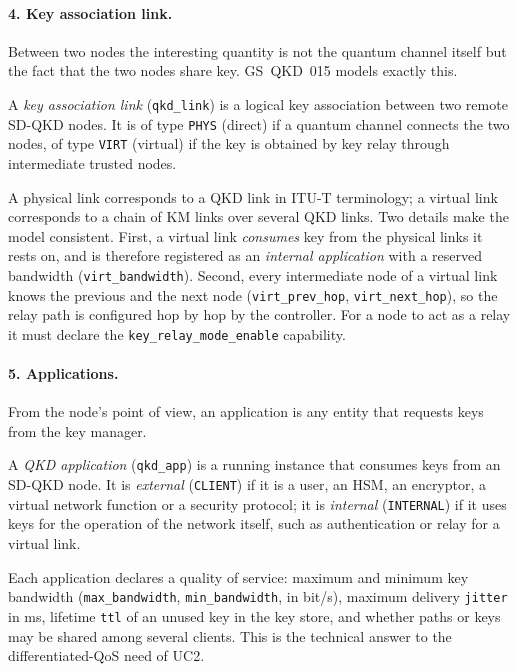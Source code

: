 

\paragraph{4. Key association link.}
Between two nodes the interesting quantity is not the quantum channel
itself but the fact that the two nodes share key. GS~QKD~015 models exactly
this.

\begin{definition}
A \emph{key association link} (\texttt{qkd\_link}) is a logical key
association between two remote SD-QKD nodes. It is of type \texttt{PHYS}
(direct) if a quantum channel connects the two nodes, of type \texttt{VIRT}
(virtual) if the key is obtained by key relay through intermediate trusted
nodes.
\end{definition}

A physical link corresponds to a QKD link in ITU-T terminology; a virtual
link corresponds to a chain of KM links over several QKD links. Two details
make the model consistent. First, a virtual link \emph{consumes} key from
the physical links it rests on, and is therefore registered as an
\emph{internal application} with a reserved bandwidth
(\texttt{virt\_bandwidth}). Second, every intermediate node of a virtual
link knows the previous and the next node (\texttt{virt\_prev\_hop},
\texttt{virt\_next\_hop}), so the relay path is configured hop by hop by
the controller. For a node to act as a relay it must declare the
\texttt{key\_relay\_mode\_enable} capability.

\paragraph{5. Applications.}
From the node's point of view, an application is any entity that requests
keys from the key manager.

\begin{definition}
A \emph{QKD application} (\texttt{qkd\_app}) is a running instance that
consumes keys from an SD-QKD node. It is \emph{external}
(\texttt{CLIENT}) if it is a user, an HSM, an encryptor, a virtual network
function or a security protocol; it is \emph{internal}
(\texttt{INTERNAL}) if it uses keys for the operation of the network
itself, such as authentication or relay for a virtual link.
\end{definition}

Each application declares a quality of service: maximum and minimum key
bandwidth (\texttt{max\_bandwidth}, \texttt{min\_bandwidth}, in bit/s),
maximum delivery \texttt{jitter} in ms, lifetime \texttt{ttl} of an unused
key in the key store, and whether paths or keys may be shared among several
clients. This is the technical answer to the differentiated-QoS need of
UC2.

